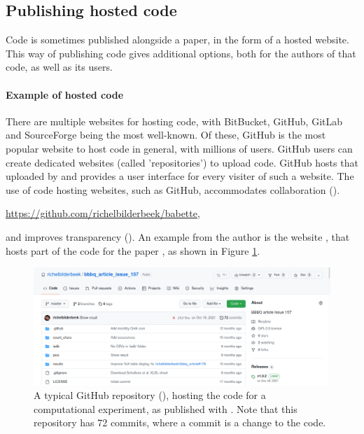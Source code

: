 \subsection{Publishing hosted code}

Code is sometimes published alongside a paper, 
in the form of a hosted website.
This way of publishing code gives additional options,
both for the authors of that code, as well as its users.

\paragraph{Example of hosted code}

There are multiple websites for hosting code, with BitBucket, GitHub,
GitLab and SourceForge being the most well-known.
Of these, GitHub is the most popular website to host code in general,
with millions of users.
GitHub users can create dedicated websites (called 'repositories')
to upload code. GitHub hosts that uploaded by and provides
a user interface for every visiter of such a website.
The use of code hosting websites, such as GitHub,
accommodates collaboration (\cite{perez2016ten}).
\begin{sloppypar}\url{https://github.com/richelbilderbeek/babette},\end{sloppypar}
and improves transparency (\cite{gorgolewski2016practical}).
An example from the author is the website \cite{bbbqarticleissue157},
that hosts part of the code for the paper \cite{bilderbeek2022transmembrane},
as shown in Figure \ref{fig:bbbqarticleissue157}.

\begin{figure}[!htbp]
  \centering
  \includegraphics[width=\linewidth]{bbbq_article_issue_157.png}
  \caption{
    A typical GitHub repository (\cite{bbbqarticleissue157}), 
    hosting the code for a
    computational experiment, 
    as published with \cite{bilderbeek2022transmembrane}.
    Note that this repository has 72 commits, where a commit is a change
    to the code.
  }
  \label{fig:bbbqarticleissue157}
\end{figure}

